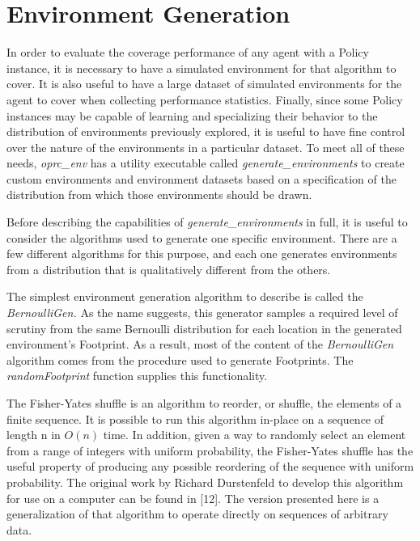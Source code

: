 \section{Environment Generation}

In order to evaluate the coverage performance of any agent with a Policy instance, it is necessary to have a simulated environment for that algorithm to cover. It is also useful to have a large dataset of simulated environments for the agent to cover when collecting performance statistics. Finally, since some Policy instances may be capable of learning and specializing their behavior to the distribution of environments previously explored, it is useful to have fine control over the nature of the environments in a particular dataset. To meet all of these needs, \textit{oprc\_env} has a utility executable called \textit{generate\_environments} to create custom environments and environment datasets based on a specification of the distribution from which those environments should be drawn.

Before describing the capabilities of \textit{generate\_environments} in full, it is useful to consider the algorithms used to generate one specific environment. There are a few different algorithms for this purpose, and each one generates environments from a distribution that is qualitatively different from the others.

The simplest environment generation algorithm to describe is called the \textit{BernoulliGen.} As the name suggests, this generator samples a required level of scrutiny from the same Bernoulli distribution for each location in the generated environment's Footprint. As a result, most of the content of the \textit{BernoulliGen} algorithm comes from the procedure used to generate Footprints. The \textit{randomFootprint} function supplies this functionality.



The Fisher-Yates shuffle is an algorithm to reorder, or shuffle, the elements of a finite sequence. It is possible to run this algorithm in-place on a sequence of length n in $O(n)$ time. In addition, given a way to randomly select an element from a range of integers with uniform probability, the Fisher-Yates shuffle has the useful property of producing any possible reordering of the sequence with uniform probability. The original work by Richard Durstenfeld to develop this algorithm for use on a computer can be found in [12]. The version presented here is a generalization of that algorithm to operate directly on sequences of arbitrary data.

